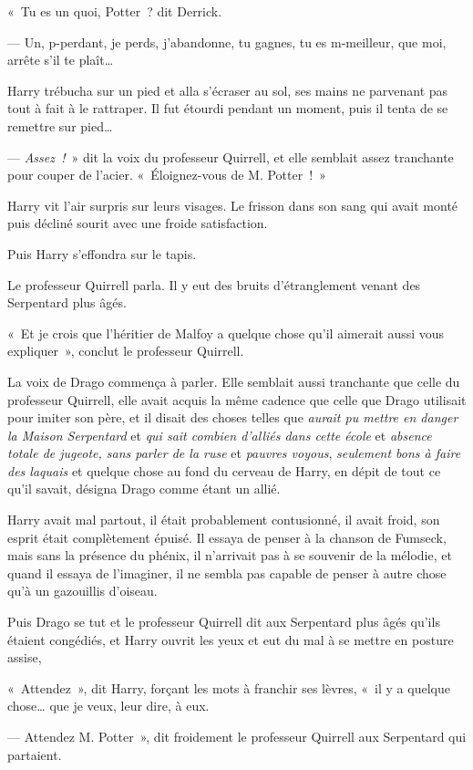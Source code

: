 «~Tu es un quoi, Potter~? dit Derrick.

--- Un, p-perdant, je perds, j'abandonne, tu gagnes, tu es m-meilleur, que moi, arrête s'il te plaît…

Harry trébucha sur un pied et alla s'écraser au sol, ses mains ne parvenant pas tout à fait à le rattraper. Il fut étourdi pendant un moment, puis il tenta de se remettre sur pied…

--- \emph{Assez~!}~» dit la voix du professeur Quirrell, et elle semblait assez tranchante pour couper de l'acier. «~Éloignez-vous de M. Potter~!~»

Harry vit l'air surpris sur leurs visages. Le frisson dans son sang qui avait monté puis décliné sourit avec une froide satisfaction.

Puis Harry s'effondra sur le tapis.

Le professeur Quirrell parla. Il y eut des bruits d'étranglement venant des Serpentard plus âgés.

«~Et je crois que l'héritier de Malfoy a quelque chose qu'il aimerait aussi vous expliquer~», conclut le professeur Quirrell.

La voix de Drago commença à parler. Elle semblait aussi tranchante que celle du professeur Quirrell, elle avait acquis la même cadence que celle que Drago utilisait pour imiter son père, et il disait des choses telles que \emph{aurait pu mettre en danger la Maison Serpentard} et \emph{qui sait combien d'alliés dans cette école} et \emph{absence totale de jugeote, sans parler de la ruse} et \emph{pauvres voyous}, \emph{seulement bons à faire des laquais} et quelque chose au fond du cerveau de Harry, en dépit de tout ce qu'il savait, désigna Drago comme étant un allié.

Harry avait mal partout, il était probablement contusionné, il avait froid, son esprit était complètement épuisé. Il essaya de penser à la chanson de Fumseck, mais sans la présence du phénix, il n'arrivait pas à se souvenir de la mélodie, et quand il essaya de l'imaginer, il ne sembla pas capable de penser à autre chose qu'à un gazouillis d'oiseau.

Puis Drago se tut et le professeur Quirrell dit aux Serpentard plus âgés qu'ils étaient congédiés, et Harry ouvrit les yeux et eut du mal à se mettre en posture assise,

«~Attendez~», dit Harry, forçant les mots à franchir ses lèvres, «~il y a quelque chose… que je veux, leur dire, à eux.

--- Attendez M. Potter~», dit froidement le professeur Quirrell aux Serpentard qui partaient.

